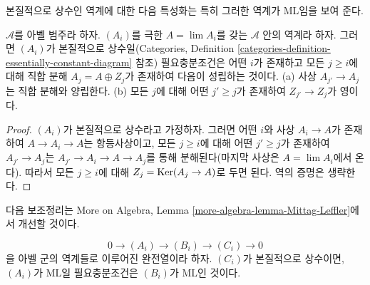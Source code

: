 \noindent
본질적으로 상수인 역계에 대한 다음 특성화는 특히 그러한 역계가
ML임을 보여 준다.

\begin{lemma}
\label{lemma-essentially-constant}
$\mathcal{A}$를 아벨 범주라 하자. $(A_i)$를 극한
$A = \lim A_i$를 갖는 $\mathcal{A}$ 안의 역계라 하자. 그러면
$(A_i)$가 본질적으로 상수일(Categories, Definition
\ref{categories-definition-essentially-constant-diagram} 참조)
필요충분조건은 어떤 $i$가 존재하고 모든 $j \geq i$에 대해 직합 분해
$A_j = A \oplus Z_j$가 존재하여 다음이 성립하는 것이다. (a) 사상
$A_{j'} \to A_j$는 직합 분해와 양립한다. (b) 모든 $j$에 대해 어떤
$j' \geq j$가 존재하여 $Z_{j'} \to Z_j$가 영이다.
\end{lemma}

\begin{proof}
$(A_i)$가 본질적으로 상수라고 가정하자. 그러면 어떤 $i$와 사상
$A_i \to A$가 존재하여 $A \to A_i \to A$는 항등사상이고, 모든
$j \geq i$에 대해 어떤 $j' \geq j$가 존재하여 $A_{j'} \to A_j$는
$A_{j'} \to A_i \to A \to A_j$를 통해 분해된다(마지막 사상은
$A = \lim A_i$에서 온다). 따라서 모든 $j \geq i$에 대해
$Z_j = \mathop{\mathrm{Ker}}(A_j \to A)$로 두면 된다. 역의 증명은 생략한다.
\end{proof}

\noindent
다음 보조정리는 More on Algebra, Lemma
\ref{more-algebra-lemma-Mittag-Leffler}에서 개선할 것이다.

\begin{lemma}
\label{lemma-exact-sequence-ML}
$$
0 \to (A_i) \to (B_i) \to (C_i) \to 0
$$
을 아벨 군의 역계들로 이루어진 완전열이라 하자. $(C_i)$가 본질적으로
상수이면, $(A_i)$가 ML일 필요충분조건은 $(B_i)$가 ML인 것이다.
\end{lemma}

